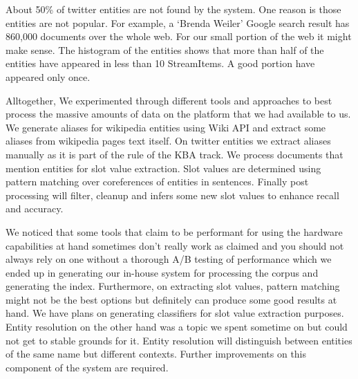 About 50\% of twitter entities are not found by the system. One reason is those entities are not popular. For example, a `Brenda Weiler' Google search result has 860,000 documents over the whole web. For our small portion of the web it might make sense. The histogram of the entities shows that more than half of the entities have appeared in less than 10 StreamItems. A good portion have appeared only once.






Alltogether, We experimented through different tools and approaches to best process the massive amounts of data on the platform that we had available to us. We generate aliases for wikipedia entities using Wiki API and extract some aliases from wikipedia pages text itself. On twitter entities we extract aliases manually as it is part of the rule of the KBA track. We process documents that mention entities for slot value extraction. Slot values are determined using pattern matching over coreferences of entities in sentences. Finally post processing will filter, cleanup and infers some new slot values to enhance recall and accuracy. 

We noticed that some tools that claim to be performant for using the hardware capabilities at hand sometimes don't really work as claimed and you should not always rely on one without a thorough A/B testing of performance which we ended up in generating our in-house system for processing the corpus and generating the index. Furthermore, on extracting slot values, pattern matching might not be the best options but definitely can produce some good results at hand. We have plans on generating classifiers for slot value extraction 
purposes. Entity resolution on the other hand was a topic we spent sometime on but could not get to stable grounds for it. Entity resolution will distinguish between entities of the same name but different contexts. Further improvements on this component of the system are required. 


